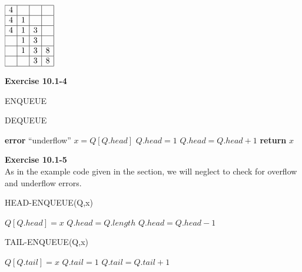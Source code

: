 \documentclass{article}
\begin{document}
$
\begin{array}{|c|c|c|c|}
\hline
4&&&\\
\hline
4&1&&\\
\hline
4&1&3&\\
\hline
&1&3&\\
\hline
&1&3&8\\
\hline
&&3&8\\
\hline
\end{array}
$

\noindent\textbf{Exercise 10.1-4}\\

\begin{algorithm}
\caption{ENQUEUE}
\end{algorithm}

\begin{algorithm}
\caption{DEQUEUE}
\begin{algorithmic}
	\State \textbf{error} ``underflow''
\EndIf
\State $x = Q[Q.head]$
	\State $Q.head = 1$
\Else
	\State $Q.head = Q.head + 1$
\EndIf
\State \textbf{return} $x$
\end{algorithmic}
\end{algorithm}

\noindent\textbf{ Exercise 10.1-5} \\

As in the example code given in the section, we will neglect to check for overflow and underflow errors.

\begin{algorithm}
\caption{HEAD-ENQUEUE(Q,x)}
\begin{algorithmic}
\State $Q[Q.head] = x$
\State $Q.head = Q.length$
\Else
\State $Q.head = Q.head-1$
\EndIf
\end{algorithmic}
\end{algorithm}

\begin{algorithm}
\caption{TAIL-ENQUEUE(Q,x)}
\begin{algorithmic}
\State $Q[Q.tail] = x$
\State $Q.tail = 1$
\Else
\State $Q.tail = Q.tail+1$
\EndIf
\end{algorithmic}
\end{algorithm}
\end{document}
